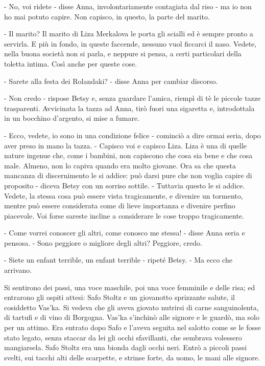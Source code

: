 - No, voi ridete - disse Anna, involontariamente contagiata dal riso - ma io non ho mai potuto capire. Non capisco, in questo, la parte del marito. 

- Il marito? Il marito di Liza Merkalova le porta gli scialli ed è sempre pronto a servirla. E più in fondo, in queste faccende, nessuno vuol ficcarci il naso. Vedete, nella buona società non si parla, e neppure si pensa, a certi particolari della toletta intima. Così anche per queste cose. 

- Sarete alla festa dei Rolandaki? - disse Anna per cambiar discorso. 

- Non credo - rispose Betsy e, senza guardare l'amica, riempì di tè le piccole tazze trasparenti. Avvicinata la tazza ad Anna, tirò fuori una sigaretta e, introdottala in un bocchino d'argento, si mise a fumare. 

- Ecco, vedete, io sono in una condizione felice - cominciò a dire ormai seria, dopo aver preso in mano la tazza. - Capisco voi e capisco Liza. Liza è una di quelle nature ingenue che, come i bambini, non capiscono che cosa sia bene e che cosa male. Almeno, non lo capiva quando era molto giovane. Ora sa che questa mancanza di discernimento le si addice: può darsi pure che non voglia capire di proposito - diceva Betsy con un sorriso sottile. - Tuttavia questo le si addice. Vedete, la stessa cosa può essere vista tragicamente, e divenire un tormento, mentre può essere considerata come di lieve importanza e divenire perfino piacevole. Voi forse sareste incline a considerare le cose troppo tragicamente. 

- Come vorrei conoscer gli altri, come conosco me stessa! - disse Anna seria e pensosa. - Sono peggiore o migliore degli altri? Peggiore, credo. 

- Siete un enfant terrible, un enfant terrible - ripeté Betsy. - Ma ecco che arrivano. 

Si sentirono dei passi, una voce maschile, poi una voce femminile e delle risa; ed entrarono gli ospiti attesi: Safo Stoltz e un giovanotto sprizzante salute, il cosiddetto Vas'ka. Si vedeva che gli aveva giovato nutrirsi di carne sanguinolenta, di tartufi e di vino di Borgogna. Vas'ka s'inchinò alle signore e le guardò, ma solo per un attimo. Era entrato dopo Safo e l'aveva seguita nel salotto come se le fosse stato legato, senza staccar da lei gli occhi sfavillanti, che sembrava volessero mangiarsela. Safo Stoltz era una bionda dagli occhi neri. Entrò a piccoli passi svelti, sui tacchi alti delle scarpette, e strinse forte, da uomo, le mani alle signore. 

